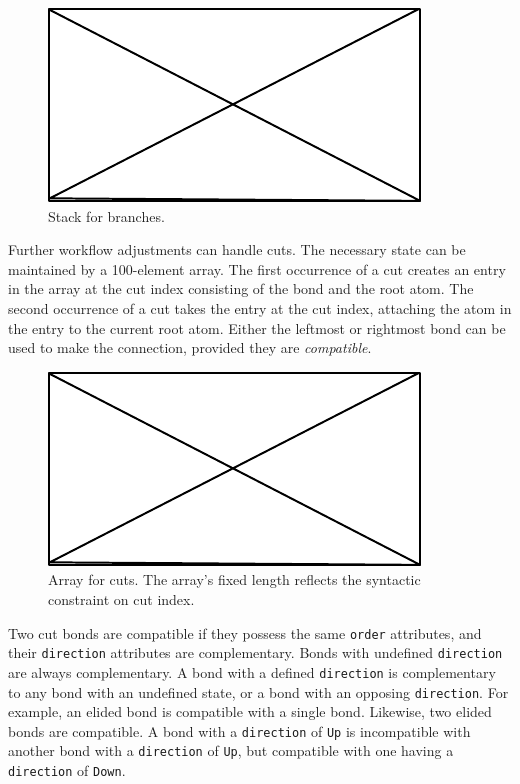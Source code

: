 \documentclass{article}
\def\ttt{\texttt}
\begin{document}
\begin{figure}
    \centering
    \includegraphics{filler}
    \caption{Stack for branches.}
    \label{fig:branches-stack}
\end{figure}

Further workflow adjustments can handle cuts. The necessary state can be maintained by a 100-element array. The first occurrence of a cut creates an entry in the array at the cut index consisting of the bond and the root atom. The second occurrence of a cut takes the entry at the cut index, attaching the atom in the entry to the current root atom. Either the leftmost or rightmost bond can be used to make the connection, provided they are \textit{compatible}.

\begin{figure}
    \centering
    \includegraphics{filler}
    \caption{Array for cuts. The array's fixed length reflects the syntactic constraint on cut index.}
    \label{fig:cuts-array}
\end{figure}

Two cut bonds are compatible if they possess the same \ttt{order} attributes, and their \ttt{direction} attributes are complementary. Bonds with undefined \ttt{direction} are always complementary. A bond with a defined \ttt{direction} is complementary to any bond with an undefined state, or a bond with an opposing \ttt{direction}. For example, an elided bond is compatible with a single bond. Likewise, two elided bonds are compatible. A bond with a \ttt{direction} of \ttt{Up} is incompatible with another bond with a \ttt{direction} of \ttt{Up}, but compatible with one having a \ttt{direction} of \ttt{Down}.
\end{document}
